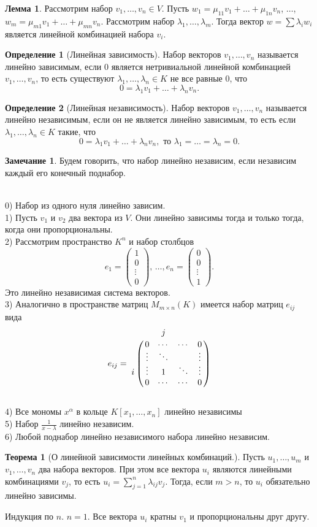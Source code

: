\documentclass[10pt,a4paper,oneside]{book}
\theoremstyle{definition}
\newtheorem*{rem}{Замечание}
\newtheorem{defn}{Определение}
\newtheorem{thm}{Теорема}
\newtheorem{lem}{Лемма}
\def\exm{\noindent {\bf Примеры:}}
\def\thrm{\begin{thm}}
\def\ethrm{\end{thm}}
\def\dfn{\begin{defn}}
\def\edfn{\end{defn}}
\def\lm{\begin{lem}}
\def\elm{\end{lem}}
\def\rm{\begin{rem}}
\def\erm{\end{rem}}
\def\pmat{\begin{pmatrix}}
\def\epmat{\end{pmatrix}}
\begin{document}
\lm Рассмотрим набор $v_1,\dots,v_n \in V$. Пусть $w_1=\mu_{11}v_1+\dots+\mu_{1n}v_n$, $\dots$, $w_m= \mu_{m1}v_1+\dots+\mu_{mn}v_n$. Рассмотрим набор $\lambda_1,\dots, \lambda_m$. Тогда вектор $w=\sum \lambda_i w_i$ является линейной комбинацией набора $v_i$. 
\elm


\dfn[Линейная зависимость] Набор векторов $v_1,\dots,v_n$ называется линейно зависимым, если 0 является нетривиальной линейной комбинацией $v_1,\dots, v_n$, то есть существуют  $\lambda_1, \dots, \lambda_n \in K$ не все равные 0, что
$$0=\lambda_1v_1+\dots+\lambda_n v_n.$$
\edfn

\dfn[Линейная независимость] Набор векторов $v_1,\dots,v_n$ называется линейно независимым, если он не является линейно зависимым, то есть если $\lambda_1, \dots, \lambda_n \in K$ такие, что $$0=\lambda_1v_1+\dots+\lambda_n v_n, \text{ то $\lambda_1=\dots=\lambda_n=0$}.$$ 
\edfn



\rm Будем говорить, что набор линейно независим, если независим каждый его конечный поднабор. 
\erm

\exm \\
0) Набор из одного нуля линейно зависим.\\
1) Пусть $v_1$ и $v_2$ два вектора из $V$. Они линейно зависимы тогда и только тогда, когда они пропорциональны.\\
2) Рассмотрим пространство $K^n$ и набор столбцов 
$$e_1=\pmat 1\\0\\ \vdots\\ 0\epmat,\, \dots, e_n=\pmat 0\\ 0 \\ \vdots \\ 1 \epmat.$$
Это линейно независимая система векторов.\\
3) Аналогично в пространстве матриц $M_{m \times n}(K)$ имеется набор матриц $e_{ij}$ вида
$$ e_{ij}= 
\bordermatrix{
 & &j&& \cr
 &0&\cdots&\cdots&0\cr
 &\vdots&\ddots && \vdots\cr
i&\vdots& 1 & \ddots& \vdots\cr
 &0&\cdots& \cdots&0
}
$$\\
4) Все мономы $x^{\alpha}$ в кольце  $K[x_1,\dots,x_n]$ линейно независимы\\
5) Набор  $\frac{1}{x-\lambda}$ линейно независим.\\
6) Любой поднабор линейно независимого набора линейно независим.\\


\thrm[О линейной зависимости линейных комбинаций.] Пусть $u_1,\dots,u_m$ и $v_1,\dots,v_n$ два набора векторов. При этом все вектора $u_i$ являются линейными комбинациями $v_j$, то есть $u_i=\sum_{j=1}^n \lambda_{ij}v_j$. Тогда, если $m>n$, то $u_i$ обязательно линейно зависимы. 
\ethrm
\proof Индукция по $n$. $n=1$. Все вектора $u_i$ кратны $v_1$ и пропорциональны друг другу.
\end{document}
